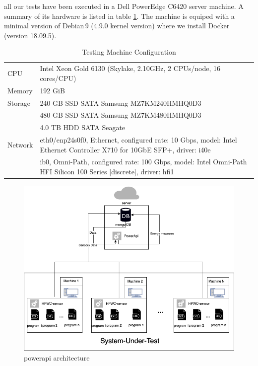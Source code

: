 all our tests have been executed in a Dell PowerEdge C6420 server machine. A summary of its hardware is listed in table \ref{fig:dahuconfig}. The machine is equiped with a minimal version of Debian\,9 (4.9.0 kernel version) where we install Docker (version 18.09.5).



\begin{table}[hbt]
    \begin{tabular}{ll}
        \hline
        CPU     & Intel Xeon Gold 6130 (Skylake, 2.10GHz, 2 CPUs/node, 16 cores/CPU)                                                     \\
        Memory  & 192 GiB                                                                                                                \\
        Storage & 240 GB SSD SATA Samsung MZ7KM240HMHQ0D3                                                                                \\
                & 480 GB SSD SATA Samsung MZ7KM480HMHQ0D3                                                                                \\
                & 4.0 TB HDD SATA Seagate                                                                                                \\
        Network & eth0/enp24s0f0, Ethernet, configured rate: 10 Gbps, model: Intel Ethernet Controller X710 for 10GbE SFP+, driver: i40e \\
                & ib0, Omni-Path, configured rate: 100 Gbps, model: Intel Omni-Path HFI Silicon 100 Series [discrete], driver: hfi1      \\
        \hline
    \end{tabular}
    \caption{Testing Machine Configuration }
    \label{fig:dahuconfig}
\end{table}

\begin{figure}[hbt]
    \includegraphics[width=\linewidth]{imgs/SmartWatts.png}
    \caption{powerapi architecture}
    \label{fig:powerapi}
\end{figure}

